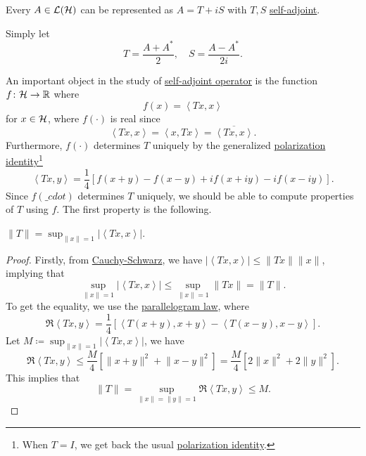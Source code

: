 \begin{remark}
	Every \(A\in \mathcal{\MakeUppercase{l}} (\mathcal{\MakeUppercase{h}} )\) can be represented as \(A = T+iS\) with \(T, S\) \hyperref[def:self-adjoint-op]{self-adjoint}.
\end{remark}
\begin{explanation}
	Simply let
	\[
		T = \frac{A + A^{\ast} }{2},\quad S = \frac{A - A^{\ast} }{2i}.
	\]
\end{explanation}

An important object in the study of \hyperref[def:self-adjoint-op]{self-adjoint operator} is the function \(f\colon \mathcal{\MakeUppercase{h}} \to \mathbb{\MakeUppercase{r}} \) where
\[
	f(x) = \left\langle Tx, x \right\rangle
\]
for \(x\in \mathcal{\MakeUppercase{h}} \), where \(f(\cdot)\) is real since
\[
	\left\langle Tx, x \right\rangle = \left\langle x, Tx \right\rangle = \overline{\left\langle Tx, x \right\rangle }.
\]
Furthermore, \(f(\cdot)\) determines \(T\) uniquely by the generalized \hyperref[lma:polarization-identity]{polarization identity}\footnote{When \(T = I\), we get back the usual \hyperref[lma:polarization-identity]{polarization identity}.}
\[
	\left\langle Tx, y \right\rangle = \frac{1}{4} \left[ f(x+ y) - f(x-y) + if(x+iy) - if(x-iy) \right].
\]
Since \(f(\_{c} dot)\) determines \(T\) uniquely, we should be able to compute properties of \(T\) using \(f\). The first property is the following.

\begin{proposition}
	\(\lVert T \rVert = \sup _{\lVert x \rVert = 1} \vert \left\langle Tx, x \right\rangle  \vert \).
\end{proposition}
\begin{proof}
	Firstly, from \hyperref[thm:Cauchy-Schwarz-ineq]{Cauchy-Schwarz}, we have \(\vert \left\langle Tx, x \right\rangle \vert \leq \lVert Tx \rVert \lVert x \rVert \), implying that
	\[
		\sup _{\lVert x \rVert = 1} \vert \left\langle Tx, x \right\rangle  \vert \leq \sup _{\lVert x \rVert = 1} \lVert Tx \rVert = \lVert T \rVert .
	\]
	To get the equality, we use the \hyperref[lma:parallelogram-law]{parallelogram law}, where
	\[
		\Re \left\langle Tx, y \right\rangle
		= \frac{1}{4} \left[ \left\langle T(x+ y) , x+y\right\rangle - \left\langle T(x-y), x-y \right\rangle  \right].
	\]
	Let \(M\coloneqq \sup _{\lVert x \rVert = 1} \vert \left\langle Tx, x \right\rangle  \vert \), we have
	\[
		\Re\left\langle Tx, y \right\rangle
		\leq \frac{M}{4} \left[ \lVert x+y \rVert ^{2} + \lVert x-y \rVert ^{2}  \right]
		= \frac{M}{4} \left[ 2\lVert x \rVert ^{2} + 2 \lVert y \rVert ^{2} \right].
	\]
	This implies that
	\[
		\lVert T \rVert = \sup _{\lVert x \rVert = \lVert y \rVert = 1} \Re \left\langle Tx, y \right\rangle  \leq M.
	\]
\end{proof}

